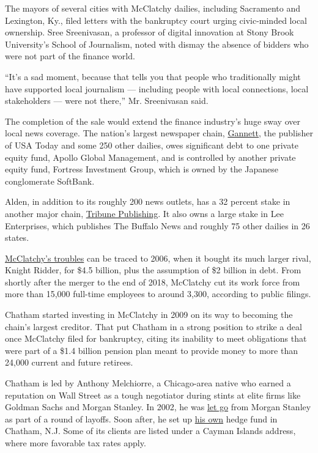 The mayors of several cities with McClatchy dailies, including
Sacramento and Lexington, Ky., filed letters with the bankruptcy court
urging civic-minded local ownership. Sree Sreenivasan, a professor of
digital innovation at Stony Brook University's School of Journalism,
noted with dismay the absence of bidders who were not part of the
finance world.

``It's a sad moment, because that tells you that people who
traditionally might have supported local journalism --- including people
with local connections, local stakeholders --- were not there,'' Mr.
Sreenivasan said.

The completion of the sale would extend the finance industry's huge sway
over local news coverage. The nation's largest newspaper chain,
\href{https://www.nytimes3xbfgragh.onion/2019/11/19/business/media/gannett-gatehouse-merger.html}{Gannett},
the publisher of USA Today and some 250 other dailies, owes significant
debt to one private equity fund, Apollo Global Management, and is
controlled by another private equity fund, Fortress Investment Group,
which is owned by the Japanese conglomerate SoftBank.

Alden, in addition to its roughly 200 news outlets, has a 32 percent
stake in another major chain,
\href{https://www.nytimes3xbfgragh.onion/2020/07/02/business/media/tribune-alden-board-seat.html}{Tribune
Publishing}. It also owns a large stake in Lee Enterprises, which
publishes The Buffalo News and roughly 75 other dailies in 26 states.

\href{https://www.nytimes3xbfgragh.onion/2006/03/13/business/media/newspaper-chain-agrees-to-a-sale-for-45-billion.html}{McClatchy's
troubles} can be traced to 2006, when it bought its much larger rival,
Knight Ridder, for \$4.5 billion, plus the assumption of \$2 billion in
debt. From shortly after the merger to the end of 2018, McClatchy cut
its work force from more than 15,000 full-time employees to around
3,300, according to public filings.

Chatham started investing in McClatchy in 2009 on its way to becoming
the chain's largest creditor. That put Chatham in a strong position to
strike a deal once McClatchy filed for bankruptcy, citing its inability
to meet obligations that were part of a \$1.4 billion pension plan meant
to provide money to more than 24,000 current and future retirees.

Chatham is led by Anthony Melchiorre, a Chicago-area native who earned a
reputation on Wall Street as a tough negotiator during stints at elite
firms like Goldman Sachs and Morgan Stanley. In 2002, he was
\href{https://www.fnlondon.com/articles/morgan-stanley-cuts-leveraged-finance-as-bank-cull-hits-2500-20021121}{let
go} from Morgan Stanley as part of a round of layoffs. Soon after, he
set up
\href{https://www.sec.gov/Archives/edgar/data/915802/000091580217000002/redmontprochathamsupplement0.htm}{his
own} hedge fund in Chatham, N.J. Some of its clients are listed under a
Cayman Islands address, where more favorable tax rates apply.

